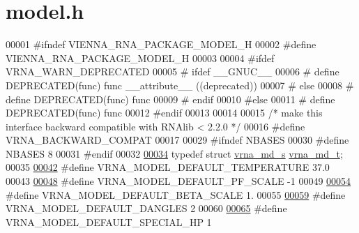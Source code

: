 \hypertarget{model_8h_source}{}\section{model.\+h}
\label{model_8h_source}

\begin{DoxyCode}
00001 \textcolor{preprocessor}{#ifndef VIENNA\_RNA\_PACKAGE\_MODEL\_H}
00002 \textcolor{preprocessor}{#define VIENNA\_RNA\_PACKAGE\_MODEL\_H}
00003 
00004 \textcolor{preprocessor}{#ifdef VRNA\_WARN\_DEPRECATED}
00005 \textcolor{preprocessor}{# ifdef \_\_GNUC\_\_}
00006 \textcolor{preprocessor}{#  define DEPRECATED(func) func \_\_attribute\_\_ ((deprecated))}
00007 \textcolor{preprocessor}{# else}
00008 \textcolor{preprocessor}{#  define DEPRECATED(func) func}
00009 \textcolor{preprocessor}{# endif}
00010 \textcolor{preprocessor}{#else}
00011 \textcolor{preprocessor}{# define DEPRECATED(func) func}
00012 \textcolor{preprocessor}{#endif}
00013 
00014 
00015 \textcolor{comment}{/* make this interface backward compatible with RNAlib < 2.2.0 */}
00016 \textcolor{preprocessor}{#define VRNA\_BACKWARD\_COMPAT}
00017 
00029 \textcolor{preprocessor}{#ifndef NBASES}
00030 \textcolor{preprocessor}{#define NBASES 8}
00031 \textcolor{preprocessor}{#endif}
00032 
\hyperlink{group__model__details_ga1f8a10e12a0a1915f2a4eff0b28ea17c}{00034} \textcolor{keyword}{typedef} \textcolor{keyword}{struct }\hyperlink{group__model__details_structvrna__md__s}{vrna\_md\_s} \hyperlink{group__model__details_structvrna__md__s}{vrna\_md\_t};
00035 
\hyperlink{group__model__details_gaf47f9850b3b4763479f7a7e7a15648a2}{00042} \textcolor{preprocessor}{#define VRNA\_MODEL\_DEFAULT\_TEMPERATURE    37.0}
00043 
\hyperlink{group__model__details_ga5505389cba74a18bbc116d2bb20256fa}{00048} \textcolor{preprocessor}{#define VRNA\_MODEL\_DEFAULT\_PF\_SCALE       -1}
00049 
\hyperlink{group__model__details_ga383d3ac8d08c3b6221754b50871c1200}{00054} \textcolor{preprocessor}{#define VRNA\_MODEL\_DEFAULT\_BETA\_SCALE     1.}
00055 
\hyperlink{group__model__details_ga2aa7bc2cae774b83a5c468f824c27a42}{00059} \textcolor{preprocessor}{#define VRNA\_MODEL\_DEFAULT\_DANGLES        2}
00060 
\hyperlink{group__model__details_gabd1ab224e1048defd45c165ed7d1c108}{00065} \textcolor{preprocessor}{#define VRNA\_MODEL\_DEFAULT\_SPECIAL\_HP     1}

\end{DoxyCode}

